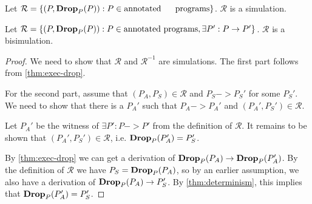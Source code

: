 \begin{corollary}[Simulation]
  \label{thm:simulation}
  Let $\mathcal{R} = \{(P, \mathbf{Drop}_{{P}}({P})) : P \in \text{annotated
    programs}\}$. $\mathcal{R}$ is a simulation.
\end{corollary}

\begin{theorem}[Bisimulation]
  \label{thm:bisimulation}
  Let
  $\mathcal{R} = \{(P, \mathbf{Drop}_{{P}}({P})) : P \in \text{annotated programs}, \exists
  P' : P -> P'\}$. $\mathcal{R}$ is a bisimulation.
\end{theorem}
\begin{proof}
  We need to show that $\mathcal{R}$ and $\mathcal{R}^{-1}$ are simulations. The
  first part follows from \autoref{thm:exec-drop}.

  For the second part, assume that $(P_A, P_S) \in \mathcal{R}$ and
  $P_S -> P_S'$ for some $P_S'$. We need to show that there is a $P_A'$ such
  that $P_A -> P_A'$ and $(P_A', P_S') \in \mathcal{R}$.

  Let $P_A'$ be the witness of $\exists P' : P -> P'$ from the definition of
  $\mathcal{R}$. It remains to be shown that $(P_A', P_S') \in \mathcal{R}$,
  i.e. $\mathbf{Drop}_{{P}}({P_A'}) = P_S'$.

  By \autoref{thm:exec-drop} we can get a derivation of
  $\mathbf{Drop}_{{P}}({P_A}) -> \mathbf{Drop}_{{P}}({P_A'})$. By the definition of $\mathcal{R}$ we have
  $P_S = \mathbf{Drop}_{{P}}({P_A})$, so by an earlier assumption, we also have a derivation
  of $\mathbf{Drop}_{{P}}({P_A}) -> P_S'$. By \autoref{thm:determinism}, this implies
  that $\mathbf{Drop}_{{P}}({P_A'}) = P_S'$.
\end{proof}

